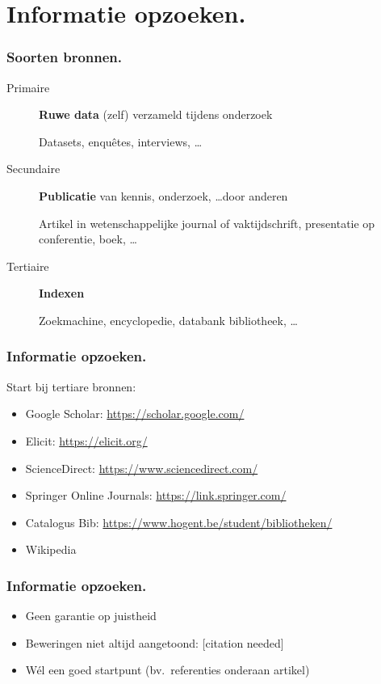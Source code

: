 \documentclass[aspectratio=169]{beamer}
\begin{document}
\section{Informatie opzoeken.}

\begin{frame}
  \frametitle{Soorten bronnen.}

  \begin{description}
    \item[Primaire] \textbf{Ruwe data} (zelf) verzameld tijdens onderzoek

      Datasets, enquêtes, interviews, \ldots

    \item[Secundaire] \textbf{Publicatie} van kennis, onderzoek, \ldots door anderen

      Artikel in wetenschappelijke journal of vaktijdschrift, presentatie op conferentie, boek, \ldots

    \item[Tertiaire] \textbf{Indexen}

      Zoekmachine, encyclopedie, databank bibliotheek, \ldots

  \end{description}

\end{frame}

\begin{frame}
  \frametitle{Informatie opzoeken.}

  Start bij \alert{tertiare} bronnen:

  \begin{itemize}
    \item Google Scholar: \url{https://scholar.google.com/}
    \item Elicit: \url{https://elicit.org/}
    \item ScienceDirect: \url{https://www.sciencedirect.com/}
    \item Springer Online Journals: \url{https://link.springer.com/}
    \item Catalogus Bib: \url{https://www.hogent.be/student/bibliotheken/}
    \item Wikipedia
  \end{itemize}
\end{frame}

\begin{frame}
  \frametitle{Informatie opzoeken.}


  {\pause}

  \begin{itemize}
    \item Geen garantie op juistheid
    \item Beweringen niet altijd aangetoond: [citation needed]
    \item \alert{Wél} een goed startpunt (bv.\ referenties onderaan artikel)
  \end{itemize}
\end{frame}
\end{document}

